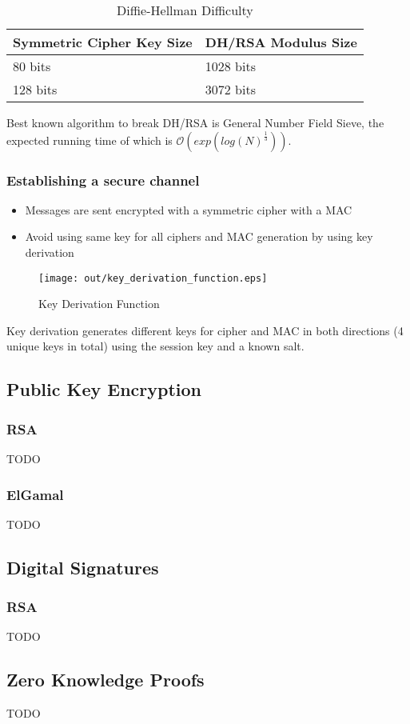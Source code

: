 \documentclass[a4paper]{article}
\begin{document}

\begin{table}[h]
  \centering
  \begin{tabular}{@{}ll@{}}
    \toprule
    Symmetric Cipher Key Size & DH/RSA Modulus Size \\
    \midrule
    80 bits                   & 1028 bits           \\
    128 bits                  & 3072 bits           \\
    \bottomrule
  \end{tabular}
  \caption{Diffie-Hellman Difficulty}
  \label{tab:diffie_hellman_difficulty}
\end{table}
\FloatBarrier

Best known algorithm to break DH/RSA is General Number Field Sieve, the expected
running time of which is $\mathcal{O}(exp(log(N)^{\frac{1}{3}}))$.

\subsubsection{Establishing a secure channel}

\begin{itemize}
  \item Messages are sent encrypted with a symmetric cipher with a MAC
  \item Avoid using same key for all ciphers and MAC generation by using key
        derivation
\end{itemize}

\begin{figure}[h!]
  \centering
  \texttt{[image: out/key\_derivation\_function.eps]}
  \caption{Key Derivation Function}
  \label{fig:key_derivation_function}
\end{figure}
\FloatBarrier

Key derivation generates different keys for cipher and MAC in both directions (4
unique keys in total) using the session key and a known salt.

\subsection{Public Key Encryption}

\subsubsection{RSA}

TODO

\subsubsection{ElGamal}

TODO

\subsection{Digital Signatures}

\subsubsection{RSA}

TODO

\subsection{Zero Knowledge Proofs}

TODO
\end{document}

